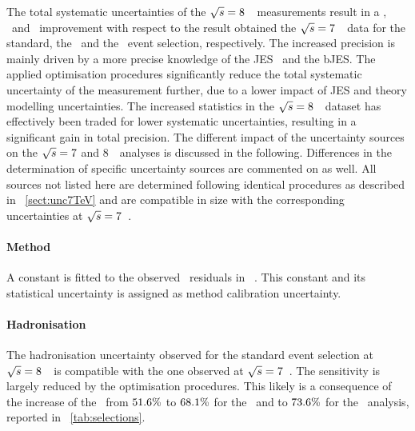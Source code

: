 The total systematic uncertainties of the ${\sqrt{s}}=8$~\TeV\ measurements result in a \EightSystStandardImprovementSeven, \EightSystImprovementSeven\ and \BDTSystImprovementSeven\ improvement with respect to the result obtained the ${\sqrt{s}}=7$~\TeV\ data for the standard, the \cutbased\ and the \mvabased\ event selection, respectively.  
%
The increased precision is mainly driven by a more precise knowledge of the \gls{JES}~\cite{ATLAS-CONF-2015-037} and the \gls{bJES}.
%
The applied optimisation procedures significantly reduce the total systematic uncertainty of the measurement further, due to a lower impact of \gls{JES} and theory modelling uncertainties. 
%
The increased statistics in the ${\sqrt{s}}=8$~\TeV\ dataset has effectively been traded for lower systematic uncertainties, resulting in a significant gain in total precision. 
%
The different impact of the uncertainty sources on the ${\sqrt{s}}=7$ and $8$~\TeV\ analyses is discussed in the following. Differences in the determination of specific uncertainty sources are commented on as well. All sources not listed here are determined following identical procedures as described in \sect~\ref{sect:unc7TeV} and are compatible in size with the corresponding uncertainties at ${\sqrt{s}}=7$~\TeV.
%
%
\paragraph{Method}\mbox{}
%
A constant is fitted to the observed \mt\ residuals in \fig~. This constant and its statistical uncertainty is assigned as method calibration uncertainty. 
%
\paragraph{Hadronisation}\mbox{}
%
The hadronisation uncertainty observed for the standard event selection at ${\sqrt{s}}=8$~\TeV\ is compatible with the one observed at ${\sqrt{s}}=7$~\TeV. The sensitivity is largely reduced by the optimisation procedures. This likely is a consequence of the increase of the \selPurity\ from $51.6\%$ to $68.1\%$ for the \cutbased\ and to $73.6\%$ for the \mvabased\ analysis, reported in \tab~\ref{tab:selections}.
%
